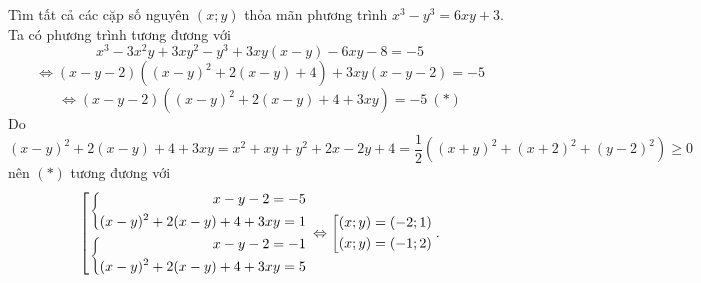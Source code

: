\begin{ex}%
Tìm tất cả các cặp số nguyên $(x;y)$ thỏa mãn phương trình $x^3-y^3=6xy+3$.
	\loigiai
    {
    Ta có phương trình tương đương với 
    $$x^3-3x^2y+3xy^2-y^3+3xy(x-y)-6xy-8=-5$$
    $$\Leftrightarrow (x-y-2)\left((x-y)^2+2(x-y)+4\right)+3xy(x-y-2)=-5$$
    $$\Leftrightarrow (x-y-2)\left((x-y)^2+2(x-y)+4+3xy\right)=-5 \ (*)$$
    Do $(x-y)^2+2(x-y)+4+3xy=x^2+xy+y^2+2x-2y+4=\dfrac{1}{2}\left((x+y)^2+(x+2)^2+(y-2)^2\right)\ge 0$ nên $(*)$ tương đương với
    $$\left[\begin{aligned}\left\{\begin{aligned}x-y-2=-5\\ (x-y)^2+2(x-y)+4+3xy=1\end{aligned}\right.\\ \left\{\begin{aligned}x-y-2=-1\\ (x-y)^2+2(x-y)+4+3xy=5\end{aligned}\right.\end{aligned}\right.
	\Leftrightarrow \left[\begin{aligned}(x;y)=(-2;1)\\ (x;y)=(-1;2)\end{aligned}\right..    
    $$
    }
\end{ex}

